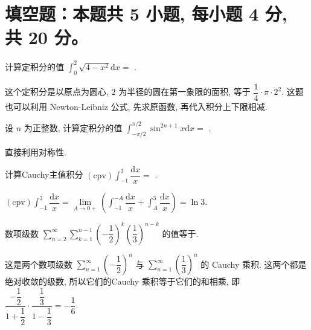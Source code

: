 \section{填空题：本题共 5 小题, 每小题 4 分, 共 20 分。}



\begin{question}
计算定积分的值 $\int_{0}^{2} \sqrt{4 - x^2} \mathrm{d} x = $ \fillin[$\pi$].
\end{question}

\begin{solution}
这个定积分是以原点为圆心, $2$ 为半径的圆在第一象限的面积, 等于 $\dfrac{1}{4} \cdot \pi \cdot 2^2.$ 这题也可以利用 Newton-Leibniz 公式, 先求原函数, 再代入积分上下限相减.
\end{solution}

\begin{question}
设 $n$ 为正整数, 计算定积分的值 $\int_{-\pi/2}^{\pi/2} \sin^{2n+1} x \mathrm{d} x = $ \fillin[$0$].
\end{question}

\begin{solution}
直接利用对称性.
\end{solution}

\begin{question}
计算Cauchy主值积分 $(\text{cpv}) \int_{-1}^{3} \dfrac{\mathrm{d}x}{x} = $ \fillin[$\ln 3$].
\end{question}

\begin{solution}
$(\text{cpv}) \int_{-1}^{3} \dfrac{\mathrm{d}x}{x} = \lim\limits_{A \to 0+} \left( \int_{-1}^{-A} \dfrac{\mathrm{d}x}{x} + \int_{A}^{3} \dfrac{\mathrm{d}x}{x} \right) = \ln 3.$
\end{solution}

\begin{question}
数项级数 $\sum\limits_{n=2}^\infty \sum\limits_{k=1}^{n-1} \left(-\dfrac{1}{2}\right)^k \left(\dfrac{1}{3}\right)^{n-k}$ 的值等于\fillin[$-\dfrac{1}{6}$].
\end{question}

\begin{solution}
这是两个数项级数 $\sum\limits_{n=1}^\infty \left(-\dfrac{1}{2}\right)^n$ 与 $\sum\limits_{n=1}^\infty \left(\dfrac{1}{3}\right)^n$ 的 Cauchy 乘积. 这两个都是绝对收敛的级数, 所以它们的Cauchy 乘积等于它们的和相乘, 即 $\dfrac{-\dfrac{1}{2}}{1 + \dfrac{1}{2}} \cdot \dfrac{\dfrac{1}{3}}{1 - \dfrac{1}{3}} = -\dfrac{1}{6}.$
\end{solution}

